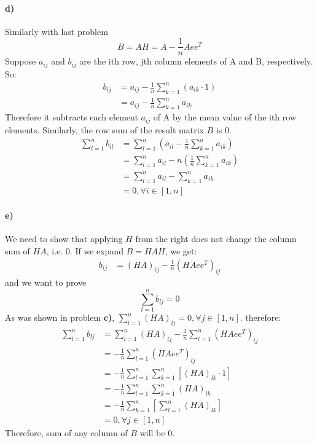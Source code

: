 \documentclass{article}
\begin{document}
\paragraph{d)}
Similarly with last problem
\begin{equation*}
B = AH = A - \frac{1}{n}Aee^T
\end{equation*}
Suppose $a_{ij}$ and $b_{ij}$ are the ith row, jth column elements of A and B, respectively. So:
\begin{align*}
b_{ij} &= a_{ij} - \frac{1}{n}\sum_{k=1}^{n}(a_{ik}\cdot 1) \\
&=a_{ij} - \frac{1}{n}\sum_{k=1}^{n}a_{ik}
\end{align*}
Therefore it subtracts each element $a_{ij}$ of A by the mean value of the ith row elements. Similarly, the row sum of the result matrix $B$ is 0. 
\begin{align*}
\sum_{l=1}^{n}b_{il} &= \sum_{l=1}^{n}(a_{il}  - \frac{1}{n}\sum_{k=1}^{n}a_{ik}) \\
&= \sum_{l=1}^{n}a_{il} - n(\frac{1}{n}\sum_{k=1}^{n}a_{ik})\\
&= \sum_{l=1}^{n}a_{il} - \sum_{k=1}^{n}a_{ik}\\
&=0, \forall i \in [1,n]
\end{align*}
\paragraph{e)}
We need to show that applying $H$ from the right does not change the column sum of $HA$, i.e. 0. If we expand $B=HAH$, we get:
\begin{align*}
\label{2e_first_eq}
b_{ij} &= (HA)_{ij} - \frac{1}{n}(HAee^T)_{ij}
\end{align*}
and we want to prove
\begin{equation*}
\sum_{l=1}^{n}b_{lj} = 0
\end{equation*}
As was shown in problem \textbf{c)}, $\sum_{l=1}^{n}(HA)_{lj} = 0, \forall j \in [1,n]$. therefore:
\begin{align*}
\sum_{l=1}^{n}b_{lj} &= \sum_{l=1}^{n}(HA)_{lj} - \frac{1}{n}\sum_{l=1}^{n}(HAee^T)_{lj} \\
&= - \frac{1}{n}\sum_{l=1}^{n}(HAee^T)_{lj}\\
&= - \frac{1}{n}\sum_{l=1}^{n}\sum_{k=1}^{n}[(HA)_{lk} \cdot 1]\\
&= - \frac{1}{n}\sum_{l=1}^{n}\sum_{k=1}^{n}(HA)_{lk} \\
&= - \frac{1}{n}\sum_{k=1}^{n}[\sum_{l=1}^{n}(HA)_{lk}] \\
&= 0, \forall j \in [1,n]
\end{align*}
Therefore, sum of any column of $B$ will be 0. 
\end{document}
